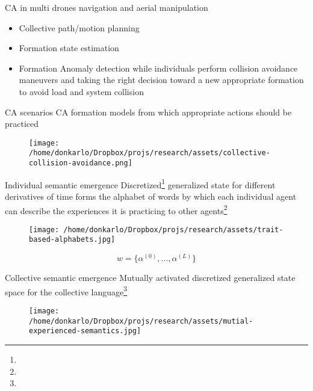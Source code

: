 \documentclass[unknownkeysallowed]{beamer}
\begin{document}
	\begin{frame}{CA in multi drones navigation and aerial manipulation}
		\begin{itemize}
			\item Collective path/motion planning
			\item Formation state estimation
			\item Formation Anomaly detection while individuals perform collision avoidance maneuvers and taking the right decision toward a new appropriate formation to avoid load and system collision
		\end{itemize}
	\end{frame}

	\begin{frame}{CA scenarios}
		CA formation models from which appropriate actions should be practiced
		\begin{figure}
			\texttt{[image: /home/donkarlo/Dropbox/projs/research/assets/collective-collision-avoidance.png]}
			\caption{}
		\end{figure}
	\end{frame}

	\begin{frame}{Individual semantic emergence}
		Discretized\footnote{} generalized state for different derivatives of time forms the alphabet of words by which each individual agent can describe the experiences it is practicing to other agents\footnote{}
		\begin{figure}
			\texttt{[image: /home/donkarlo/Dropbox/projs/research/assets/trait-based-alphabets.jpg]}
			\caption{}
		\end{figure}
		\begin{equation}
			w = \{\alpha^{(0)},...,\alpha^{(L)}\}
		\end{equation}
	\end{frame}

	\begin{frame}{Collective semantic emergence}
		Mutually activated discretized generalized state space for the collective language\footnote{}
		\begin{figure}
			\texttt{[image: /home/donkarlo/Dropbox/projs/research/assets/mutial-experienced-semantics.jpg]}
			\caption{}
		\end{figure}
	\end{frame}
\end{document}
